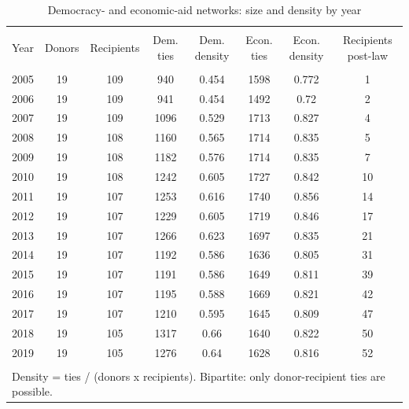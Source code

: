 
\begin{table}[!htbp] \centering 
  \caption{Democracy- and economic-aid networks: size and density by year} 
  \label{tab:netdesc} 
\footnotesize 
\begin{tabular}{@{\extracolsep{5pt}} cccccccc} 
\\[-1.8ex]\hline 
\hline \\[-1.8ex] 
Year & Donors & Recipients & Dem. ties & Dem. density & Econ. ties & Econ. density & Recipients post-law \\ 
\hline \\[-1.8ex] 
2005 & 19 & 109 & 940 & 0.454 & 1598 & 0.772 & 1 \\ 
2006 & 19 & 109 & 941 & 0.454 & 1492 & 0.72 & 2 \\ 
2007 & 19 & 109 & 1096 & 0.529 & 1713 & 0.827 & 4 \\ 
2008 & 19 & 108 & 1160 & 0.565 & 1714 & 0.835 & 5 \\ 
2009 & 19 & 108 & 1182 & 0.576 & 1714 & 0.835 & 7 \\ 
2010 & 19 & 108 & 1242 & 0.605 & 1727 & 0.842 & 10 \\ 
2011 & 19 & 107 & 1253 & 0.616 & 1740 & 0.856 & 14 \\ 
2012 & 19 & 107 & 1229 & 0.605 & 1719 & 0.846 & 17 \\ 
2013 & 19 & 107 & 1266 & 0.623 & 1697 & 0.835 & 21 \\ 
2014 & 19 & 107 & 1192 & 0.586 & 1636 & 0.805 & 31 \\ 
2015 & 19 & 107 & 1191 & 0.586 & 1649 & 0.811 & 39 \\ 
2016 & 19 & 107 & 1195 & 0.588 & 1669 & 0.821 & 42 \\ 
2017 & 19 & 107 & 1210 & 0.595 & 1645 & 0.809 & 47 \\ 
2018 & 19 & 105 & 1317 & 0.66 & 1640 & 0.822 & 50 \\ 
2019 & 19 & 105 & 1276 & 0.64 & 1628 & 0.816 & 52 \\ 
\hline \\[-1.8ex] 
\multicolumn{8}{l}{Density = ties / (donors x recipients). Bipartite: only donor-recipient ties are possible.} \\ 
\end{tabular} 
\end{table} 
